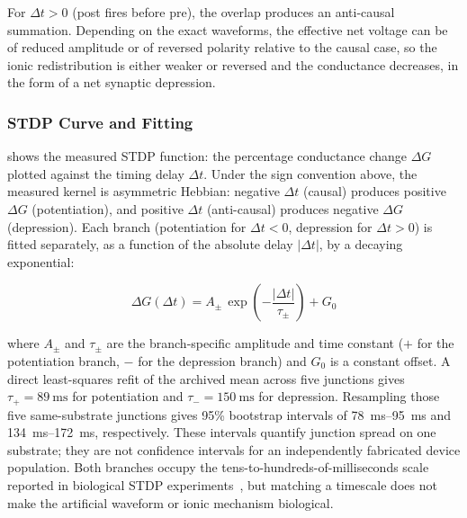 \documentclass[12pt, twoside]{report}
\begin{document}
For \(\Delta t > 0\) (post fires before pre), the overlap produces an anti-causal summation. Depending on the exact waveforms, the effective net voltage can be of reduced amplitude or of reversed polarity relative to the causal case, so the ionic redistribution is either weaker or reversed and the conductance decreases, in the form of a net synaptic depression.

\subsubsection{STDP Curve and Fitting}

 shows the measured STDP function: the percentage conductance change $\Delta G$ plotted against the timing delay $\Delta t$. Under the sign convention above, the measured kernel is asymmetric Hebbian: negative $\Delta t$ (causal) produces positive $\Delta G$ (potentiation), and positive $\Delta t$ (anti-causal) produces negative $\Delta G$ (depression). Each branch (potentiation for $\Delta t < 0$, depression for $\Delta t > 0$) is fitted separately, as a function of the absolute delay $|\Delta t|$, by a decaying exponential:

\begin{equation}
  \Delta G(\Delta t) = A_{\pm}\,\exp\!\left(-\frac{|\Delta t|}{\tau_{\pm}}\right) + G_0
  \label{eq:stdp_fit}
\end{equation}

where $A_{\pm}$ and $\tau_{\pm}$ are the branch-specific amplitude and time constant ($+$ for the potentiation branch, $-$ for the depression branch) and $G_0$ is a constant offset. A direct least-squares refit of the archived mean across five junctions gives $\tau_{+}=\SI{89}{\milli\second}$ for potentiation and $\tau_{-}=\SI{150}{\milli\second}$ for depression. Resampling those five same-substrate junctions gives 95\% bootstrap intervals of \SIrange{78}{95}{\milli\second} and \SIrange{134}{172}{\milli\second}, respectively. These intervals quantify junction spread on one substrate; they are not confidence intervals for an independently fabricated device population. Both branches occupy the tens-to-hundreds-of-milliseconds scale reported in biological STDP experiments~\cite{Kuzum2013,Bi1998}, but matching a timescale does not make the artificial waveform or ionic mechanism biological.
\end{document}
